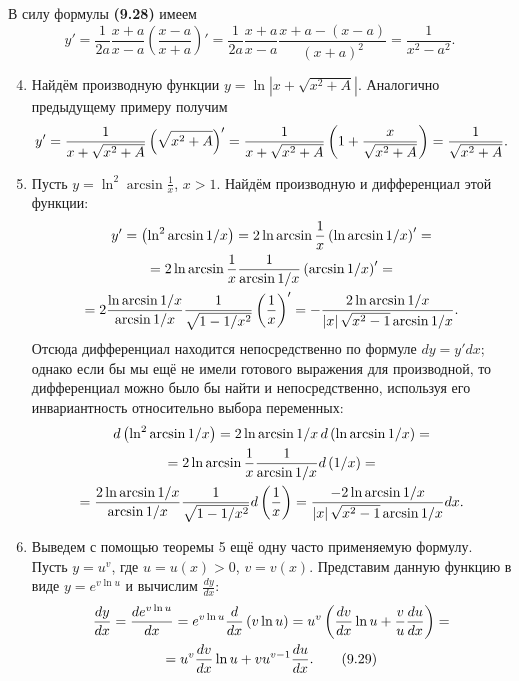 \documentclass[11pt]{article}
\newcommand*{\hm}[1]{#1\nobreak\discretionary{}{\hbox{$\mathsurround=0pt #1$}}{}}
\newcommand\abs[1]{\left\lvert#1\right\rvert}
\begin{document}
В силу формулы \textbf{(9.28)} имеем
$$
y' = \frac{1}{2a} \frac{x + a}{x - a} \left( \frac{x - a}{x + a} \right)' = \frac{1}{2a} \frac{x + a}{x - a} \frac{x + a - \left( x - a \right)}{\left( x + a \right)^2} = \frac{1}{x^2 - a^2}.
$$
\begin{enumerate}[label=\bfseries \arabic*.]
\setcounter{enumi}{3}
\item
Найдём производную функции $ y = \ln \abs{x + \sqrt{x ^ 2 + A}} $.
Аналогично предыдущему примеру получим
$$
y' = \frac{1}{x + \sqrt{x^2 + A}} \left( \sqrt{x^2 + A} \right)' \hm=
\frac{1}{x + \sqrt{x^2 + A}} \left( 1 + \frac{x}{\sqrt{x^2 + A}} \right) \hm= \frac{1}{\sqrt{x^2 + A}}.
$$
\item
Пусть $ y = \ln^2 \arcsin \tfrac{1}{x} $, $ x > 1 $. Найдём производную и дифференциал этой функции:
\begin{gather}
y' = \left( \ln^2 \arcsin 1 / x \right) = 2 \ln \arcsin \dfrac{1}{x} \left( \ln \arcsin 1 / x \right)' = \notag \\
= 2 \ln \arcsin \dfrac{1}{x} \dfrac{1}{\arcsin 1 / x} \left( \arcsin 1 / x \right)' \hm= \notag \\
= 2 \dfrac{\ln \arcsin 1 / x}{\arcsin 1 / x} \dfrac{1}{\sqrt{1 - 1 / x^2}} \left( \dfrac{1}{x}\right)' = -\dfrac{2 \ln \arcsin 1 / x}{\abs{x} \sqrt{x^2 - 1} \arcsin 1 / x}. \notag
\end{gather}
Отсюда дифференциал находится непосредственно по формуле $ dy = y' dx $; однако если бы мы ещё не имели готового выражения для производной, то дифференциал можно было бы найти и непосредственно, используя его инвариантность относительно выбора переменных:
\begin{gather}
d \left( \ln^2 \arcsin 1 / x \right) = 2 \ln \arcsin 1 / x \, d \left( \ln \arcsin 1 / x \right) = \notag \\
= 2 \ln \arcsin \frac{1}{x} \frac{1}{\arcsin 1 / x} d \left( 1 / x \right) = \notag \\
= \frac{2 \ln \arcsin 1 / x}{\arcsin 1 / x}	\frac{1}{\sqrt{1 - 1 / x^2}} d \left( \frac{1}{x} \right) = \frac{-2 \ln \arcsin 1 / x}{\abs{x} \sqrt{x^2 - 1} \arcsin 1 / x} dx. \notag
\end{gather}
\item
Выведем с помощью теоремы 5 ещё одну часто применяемую формулу. Пусть $ y = u^v $, где $ u = u(x) > 0 $, $ v = v(x) $. Представим данную функцию в виде $ y = e^{v \ln u} $ и вычислим $ \tfrac{dy}{dx} $:
\begin{gather}
\dfrac{dy}{dx} = \dfrac{de^{v \ln u}}{dx} = e^{v \ln u} \dfrac{d}{dx} \left( v \ln u \right) = u^v \left( \dfrac{dv}{dx} \ln u + \dfrac{v}{u} \dfrac{du}{dx} \right) = \notag \\
= u^v \dfrac{dv}{dx} \ln u + vu^{v - 1} \dfrac{du}{dx}. \tag{9.29}
\end{gather}
\end{enumerate}
\end{document}
